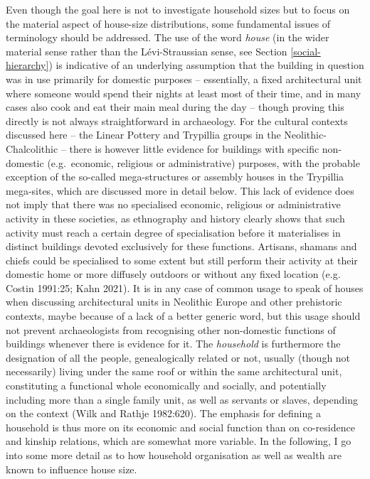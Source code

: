 \documentclass[
  12pt,
]{book}
\begin{document}
Even though the goal here is not to investigate household sizes but to focus on the material aspect of house-size distributions, some fundamental issues of terminology should be addressed. The use of the word \emph{house} (in the wider material sense rather than the Lévi-Straussian sense, see Section \ref{social-hierarchy}) is indicative of an underlying assumption that the building in question was in use primarily for domestic purposes -- essentially, a fixed architectural unit where someone would spend their nights at least most of their time, and in many cases also cook and eat their main meal during the day -- though proving this directly is not always straightforward in archaeology. For the cultural contexts discussed here -- the Linear Pottery and Trypillia groups in the Neolithic-Chalcolithic -- there is however little evidence for buildings with specific non-domestic (e.g.~economic, religious or administrative) purposes, with the probable exception of the so-called mega-structures or assembly houses in the Trypillia mega-sites, which are discussed more in detail below. This lack of evidence does not imply that there was no specialised economic, religious or administrative activity in these societies, as ethnography and history clearly shows that such activity must reach a certain degree of specialisation before it materialises in distinct buildings devoted exclusively for these functions. Artisans, shamans and chiefs could be specialised to some extent but still perform their activity at their domestic home or more diffusely outdoors or without any fixed location (e.g. Costin 1991:25; Kahn 2021). It is in any case of common usage to speak of houses when discussing architectural units in Neolithic Europe and other prehistoric contexts, maybe because of a lack of a better generic word, but this usage should not prevent archaeologists from recognising other non-domestic functions of buildings whenever there is evidence for it. The \emph{household} is furthermore the designation of all the people, genealogically related or not, usually (though not necessarily) living under the same roof or within the same architectural unit, constituting a functional whole economically and socially, and potentially including more than a single family unit, as well as servants or slaves, depending on the context (Wilk and Rathje 1982:620). The emphasis for defining a household is thus more on its economic and social function than on co-residence and kinship relations, which are somewhat more variable. In the following, I go into some more detail as to how household organisation as well as wealth are known to influence house size.
\end{document}
